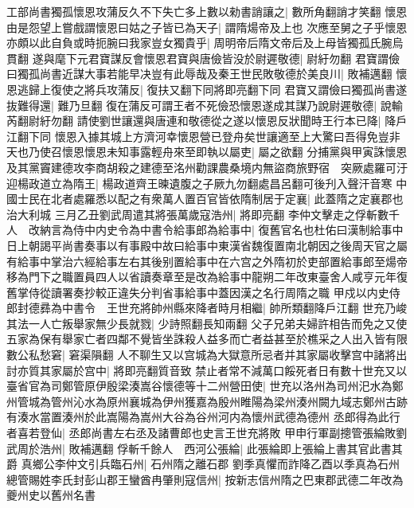 工部尚書獨孤懷恩攻蒲反久不下失亡多上數以勑書誚讓之|{
	數所角翻誚才笑翻}
懷恩由是怨望上嘗戲謂懷恩曰姑之子皆已為天子|{
	謂隋煬帝及上也}
次應至舅之子乎懷恩亦頗以此自負或時扼腕曰我家豈女獨貴乎|{
	周明帝后隋文帝后及上母皆獨孤氏腕烏貫翻}
遂與麾下元君寶謀反會懷恩君寶與唐儉皆没於尉遲敬德|{
	尉紆勿翻}
君寶謂儉曰獨孤尚書近謀大事若能早决豈有此辱哉及秦王世民敗敬德於美良川|{
	敗補邁翻}
懷恩逃歸上復使之將兵攻蒲反|{
	復扶又翻下同將即亮翻下同}
君寶又謂儉曰獨孤尚書遂抜難得還|{
	難乃旦翻}
復在蒲反可謂王者不死儉恐懷恩遂成其謀乃說尉遲敬德|{
	說輸芮翻尉紆勿翻}
請使劉世讓還與唐連和敬德從之遂以懷恩反狀聞時王行本已降|{
	降戶江翻下同}
懷恩入據其城上方濟河幸懷恩營已登舟矣世讓適至上大驚曰吾得免豈非天也乃使召懷恩懷恩未知事露輕舟來至即執以屬吏|{
	屬之欲翻}
分捕黨與甲寅誅懷恩及其黨竇建德攻李商胡殺之建德至洺州勸課農桑境内無盜商旅野宿　突厥處羅可汙迎楊政道立為隋王|{
	楊政道齊王暕遺腹之子厥九勿翻處昌呂翻可後刋入聲汗音寒}
中國士民在北者處羅悉以配之有衆萬人置百官皆依隋制居于定襄|{
	此蓋隋之定襄郡也治大利城}
三月乙丑劉武周遣其將張萬歲寇浩州|{
	將即亮翻}
李仲文擊走之俘斬數千人　改納言為侍中内史令為中書令給事郎為給事中|{
	復舊官名也杜佑曰漢制給事中日上朝謁平尚書奏事以有事殿中故曰給事中東漢省魏復置南北朝因之後周天官之屬有給事中掌治六經給事左右其後别置給事中在六宫之外隋初於吏部置給事郎至煬帝移為門下之職置員四人以省讀奏章至是改為給事中龍朔二年改東臺舍人咸亨元年復舊掌侍從讀署奏抄較正違失分判省事給事中蓋因漢之名行周隋之職}
甲戍以内史侍郎封德彞為中書令　王世充將帥州縣來降者時月相繼|{
	帥所類翻降戶江翻}
世充乃峻其法一人亡叛舉家無少長就戮|{
	少詩照翻長知兩翻}
父子兄弟夫婦許相告而免之又使五家為保有舉家亡者四鄰不覺皆坐誅殺人益多而亡者益甚至於樵采之人出入皆有限數公私愁窘|{
	窘渠隕翻}
人不聊生又以宫城為大獄意所忌者并其家屬收擊宫中諸將出討亦質其家屬於宫中|{
	將即亮翻質音致}
禁止者常不減萬口餒死者日有數十世充又以臺省官為司鄭管原伊殷梁湊嵩谷懷德等十二州營田使|{
	世充以洛州為司州汜水為鄭州管城為管州沁水為原州襄城為伊州獲嘉為殷州睢陽為梁州湊州闕九域志鄭州古跡有湊水當置湊州於此嵩陽為嵩州大谷為谷州河内為懷州武德為德州}
丞郎得為此行者喜若登仙|{
	丞郎尚書左右丞及諸曹郎也史言王世充將敗}
甲申行軍副摠管張綸敗劉武周於浩州|{
	敗補邁翻}
俘斬千餘人　西河公張綸|{
	此張綸即上張綸上書其官此書其爵}
真鄉公李仲文引兵臨石州|{
	石州隋之離石郡}
劉季真懼而詐降乙酉以季真為石州總管賜姓李氏封彭山郡王蠻酋冉肇則寇信州|{
	按新志信州隋之巴東郡武德二年改為夔州史以舊州名書}


